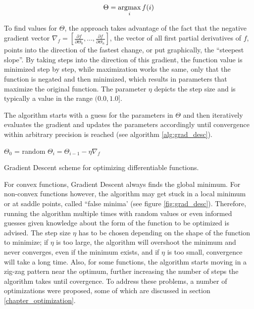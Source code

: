 \[ \Theta = \operatorname*{\arg\!\max} \limits_{i} f(i) \]

\noindent To find values for $\Theta$, the approach takes advantage of the fact that the negative gradient vector $\nabla_f = [ \frac{\partial f}{\partial \Theta_0}, \dots, \frac{\partial f}{\partial \Theta_n} ]$, the vector of all first partial derivatives of $f$, points into the direction of the fastest change, or put graphically, the ``steepest slope''. By taking steps into the direction of this gradient, the function value is minimized step by step, while maximization works the same, only that the function is negated and then minimized, which results in parameters that maximize the original function. The parameter $\eta$ depicts the step size and is typically a value in the range $(0.0, 1.0]$. \cite[pp. 40--42]{optimization_book}

The algorithm starts with a guess for the parameters in $\Theta$ and then iteratively evaluates the gradient and updates the parameters accordingly until convergence within arbitrary precision is reached (see algorithm \ref{alg:grad_desc}).

\begin {algorithm}
	\begin {algorithmic}[1]
		\State $\Theta_0$ = random
			\State $\Theta_i = \Theta_{i-1} - \eta \nabla_f$ 
		\EndWhile
	\end{algorithmic}
	\caption{Gradient Descent scheme for optimizing differentiable functions.}
	\label{alg:grad_desc}
\end{algorithm}

\noindent For convex functions, Gradient Descent always finds the global minimum. For non-convex functions however, the algorithm may get stuck in a local minimum or at saddle points, called ``false minima' (see figure \ref{fig:grad_desc}). Therefore, running the algorithm multiple times with random values or even informed guesses given knowledge about the form of the function to be optimized is advised. The step size $\eta$ has to be chosen depending on the shape of the function to minimize; if $\eta$ is too large, the algorithm will overshoot the minimum and never converges, even if the minimum exists, and if $\eta$ is too small, convergence will take a long time. Also, for some functions, the algorithm starts moving in a zig-zag pattern near the optimum, further increasing the number of steps the algorithm takes until covergence. To address these problems, a number of optimizations were proposed, some of which are discussed in section \ref{chapter_optimization}.


